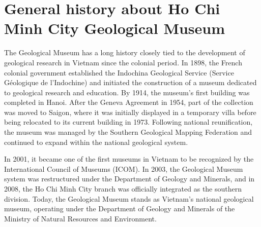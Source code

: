 \section{General history about Ho Chi Minh City Geological Museum}
\label{sec:history}

The Geological Museum has a long history closely tied to the development of geological research in Vietnam since the colonial period. In 1898, the French colonial government established the Indochina Geological Service (Service Géologique de l'Indochine) and initiated the construction of a museum dedicated to geological research and education. By 1914, the museum's first building was completed in Hanoi. After the Geneva Agreement in 1954, part of the collection was moved to Saigon, where it was initially displayed in a temporary villa before being relocated to its current building in 1973. Following national reunification, the museum was managed by the Southern Geological Mapping Federation and continued to expand within the national geological system.

In 2001, it became one of the first museums in Vietnam to be recognized by the International Council of Museums (ICOM). In 2003, the Geological Museum system was restructured under the Department of Geology and Minerals, and in 2008, the Ho Chi Minh City branch was officially integrated as the southern division. Today, the Geological Museum stands as Vietnam's national geological museum, operating under the Department of Geology and Minerals of the Ministry of Natural Resources and Environment.